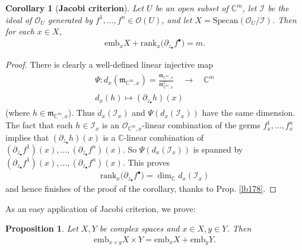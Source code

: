 \documentclass[12pt,b5paper,notitlepage]{report}
\theoremstyle{definition}
\theoremstyle{plain}
\newtheorem{pp}[df]{Proposition}
\newtheorem{co}[df]{Corollary}
\newcommand{\mc}{\mathcal}
\newcommand{\scr}{\mathscr}
\newcommand{\blt}{\bullet}
\newcommand{\Cbb}{\mathbb C}
\newcommand{\Specan}{\mathrm{Specan}}
\newcommand{\rank}{\mathrm{rank}}
\newcommand{\emb}{\mathrm{emb}}
\newcommand{\mk}{\mathfrak m}
\numberwithin{equation}{section}
\begin{document}
\begin{co}[\textbf{Jacobi criterion}]\label{lb383}
Let $U$ be an open subset of $\Cbb^m$, let $\mc I$ be the ideal of $\scr O_U$ generated by $f^1,\dots,f^n\in\scr O(U)$, and let $X=\Specan(\scr O_U/\mc I)$. Then for each $x\in X$,
\begin{align}
\emb_xX+\rank_x\big(\partial_{z_\blt}f^\blt\big)=m.
\end{align}
\end{co}


\begin{proof}
There is clearly a well-defined linear injective map
\begin{gather}
\begin{gathered}
\Psi:d_x(\mk_{\Cbb^m,x})=\frac{\mk_{\Cbb^m,x}}{\mk_{\Cbb^m,x}^2}\quad\longrightarrow \quad\Cbb^m\\
d_x(h)\mapsto (\partial_{z_\blt}h)(x)
\end{gathered}
\end{gather}
(where $h\in\mk_{\Cbb^m,x}$). Thus $d_x(\mc I_x)$ and $\Psi(d_x(\mc I_x))$ have the same dimension. The fact that each $h\in\mc I_x$ is an $\scr O_{\Cbb^m,x}$-linear combination of the germs $f^1_x,\dots,f^n_x$ implies that $(\partial_{z_\blt}h)(x)$ is a $\Cbb$-linear combination of $(\partial_{z_\blt}f^1)(x),\dots,(\partial_{z_\blt}f^n)(x)$. So $\Psi(d_x(\mc I_x))$ is spanned by $(\partial_{z_\blt}f^1)(x),\dots,(\partial_{z_\blt}f^n)(x)$. This proves
\begin{align}
\rank_x\big(\partial_{z_\blt}f^\blt\big)=\dim_\Cbb d_x(\mc I_x)
\end{align}
and hence finishes of the proof of the corollary, thanks to Prop. \ref{lb178}.
\end{proof}



As an easy application of Jacobi criterion, we prove:

\begin{pp}\label{lb183}
Let $X,Y$ be complex spaces and $x\in X,y\in Y$. Then
\begin{align}
\emb_{x\times y}X\times Y=\emb_xX+\emb_yY.
\end{align}
\end{pp}
\end{document}
